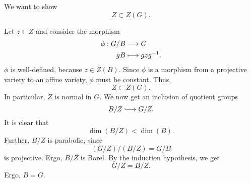 We want to show
\[ Z \subset Z(G). \]

Let $z \in Z$ and consider the morphism
\begin{align*}
\phi : G/B & \overset{}{\longrightarrow} G\\
gB & \longmapsto gzg^{-1}.
\end{align*}
$\phi$ is well-defined, because $z \in Z(B)$. Since $\phi$ is a morphism from a projective variety to an affine variety, $\phi$ must be constant. Thus,
\[ Z \subset Z(G). \]
In particular, $Z$ is normal in $G$. We now get an inclusion of quotient groups
\[ B/Z \Inj{} G/Z. \]
It is clear that
\[ \dim(B/Z) < \dim(B). \]
Further, $B/Z$ is parabolic, since
\[ (G/Z) / (B/Z) = G/B \]
is projective. Ergo, $B/Z$ is Borel. By the induction hypothesis, we get
\[ G/Z = B/Z. \]
Ergo, $B = G$.
